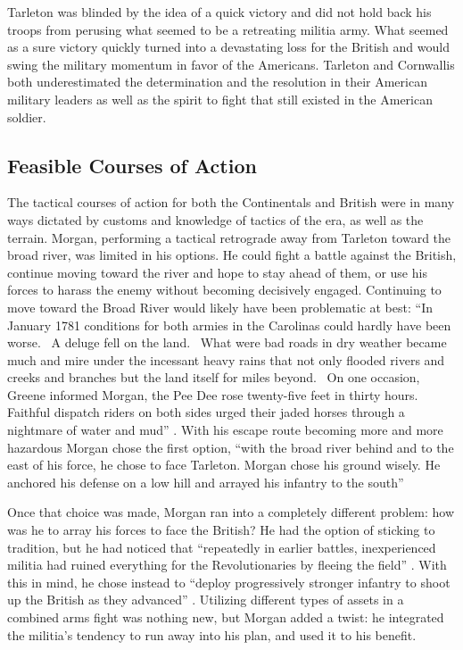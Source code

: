 Tarleton was blinded by the idea of a quick victory and did not hold back his
troops from perusing what seemed to be a retreating militia army. What seemed as
a sure victory quickly turned into a devastating loss for the British and would
swing the military momentum in favor of the Americans. Tarleton and Cornwallis
both underestimated the determination and the resolution in their American
military leaders as well as the spirit to fight that still existed in the
American soldier. 

\subsection{Feasible Courses of Action}

The tactical courses of action for both the Continentals and British were in
many ways dictated by customs and knowledge of tactics of the era, as well as
the terrain.  Morgan, performing a tactical retrograde away from Tarleton toward
the broad river, was limited in his options.  He could fight a battle against
the British, continue moving toward the river and hope to stay ahead of them, or
use his forces to harass the enemy without becoming decisively engaged.
Continuing to move toward the Broad River would likely have been problematic at
best: “In January 1781 conditions for both armies in the Carolinas could hardly
have been worse.  A deluge fell on the land.  What were bad roads in dry weather
became much and mire under the incessant heavy rains that not only flooded
rivers and creeks and branches but the land itself for miles beyond.  On one
occasion, Greene informed Morgan, the Pee Dee rose twenty-five feet in thirty
hours.  Faithful dispatch riders on both sides urged their jaded horses through
a nightmare of water and mud” \cite[p.310]{buchanan_road_1997}.  With his escape route becoming
more and more hazardous Morgan chose the first option, “with the broad river
behind and to the east of his force, he chose to face Tarleton.  Morgan chose
his ground wisely.  He anchored his defense on a low hill and arrayed his
infantry to the south” \cite[32]{brinkley_back_1998}   

Once that choice was made, Morgan ran into a completely different problem: how
was he to array his forces to face the British?  He had the option of sticking
to tradition, but he had noticed that ``repeatedly in earlier battles,
inexperienced militia had ruined everything for the Revolutionaries by fleeing
the field” \cite[30]{weigley_partisan_1970}.  With this in mind, he chose instead to “deploy
progressively stronger infantry to shoot up the British as they advanced”
\cite[71]{babits_devil_2001}.  Utilizing different types of assets in a combined arms fight
was nothing new, but Morgan added a twist: he integrated the militia’s tendency
to run away into his plan, and used it to his benefit.  

